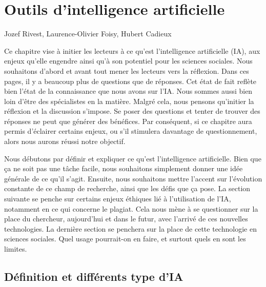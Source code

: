 \documentclass[
  letterpaper,
  DIV=11,
  numbers=noendperiod]{scrreprt}
\begin{document}

\hypertarget{sec-chap8}{%
\chapter{Outils d'intelligence artificielle}\label{sec-chap8}}

\begin{center}

Jozef Rivest, Laurence-Olivier Foisy, Hubert Cadieux

\end{center}

Ce chapitre vise à initier les lecteurs à ce qu'est l'intelligence
artificielle (IA), aux enjeux qu'elle engendre ainsi qu'à son potentiel
pour les sciences sociales. Nous souhaitons d'abord et avant tout mener
les lecteurs vers la réflexion. Dans ces pages, il y a beaucoup plus de
questions que de réponses. Cet état de fait reflète bien l'état de la
connaissance que nous avons sur l'IA. Nous sommes aussi bien loin d'être
des spécialistes en la matière. Malgré cela, nous pensons qu'initier la
réflexion et la discussion s'impose. Se poser des questions et tenter de
trouver des réponses ne peut que générer des bénéfices. Par conséquent,
si ce chapitre aura permis d'éclairer certains enjeux, ou s'il stimulera
davantage de questionnement, alors nous aurons réussi notre objectif.

Nous débutons par définir et expliquer ce qu'est l'intelligence
artificielle. Bien que ça ne soit pas une tâche facile, nous souhaitons
simplement donner une idée générale de ce qu'il s'agit. Ensuite, nous
souhaitons mettre l'accent sur l'évolution constante de ce champ de
recherche, ainsi que les défis que ça pose. La section suivante se
penche sur certains enjeux éthiques lié à l'utilisation de l'IA,
notamment en ce qui concerne le plagiat. Cela nous mène à se questionner
sur la place du chercheur, aujourd'hui et dans le futur, avec l'arrivé
de ces nouvelles technologies. La dernière section se penchera sur la
place de cette technologie en sciences sociales. Quel usage pourrait-on
en faire, et surtout quels en sont les limites.

\hypertarget{duxe9finition-et-diffuxe9rents-type-dia}{%
\section{Définition et différents type
d'IA}\label{duxe9finition-et-diffuxe9rents-type-dia}}
\end{document}

